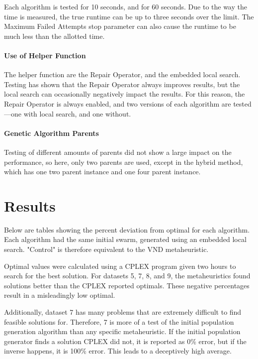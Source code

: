 \documentclass[11pt, letterpaper, onecolumn]{article}
\begin{document}
Each algorithm is tested for 10 seconds, and for 60 seconds. Due to the way the time is measured, the true runtime can be up to three seconds over the limit. The Maximum Failed Attempts stop parameter can also cause the runtime to be much less than the allotted time. 

\paragraph{Use of Helper Function}

The helper function are the Repair Operator, and the embedded local search. Testing has shown that the Repair Operator always improves results, but the local search can occasionally negatively impact the results. For this reason, the Repair Operator is always enabled, and two versions of each algorithm are tested---one with local search, and one without. 

\paragraph{Genetic Algorithm Parents}

Testing of different amounts of parents did not show a large impact on the performance, so here, only two parents are used, except in the hybrid method, which has one two parent instance and one four parent instance. 

\section{Results}

Below are tables showing the percent deviation from optimal for each algorithm. Each algorithm had the same initial swarm, generated using an embedded local search. "Control" is therefore equivalent to the VND metaheuristic. 

Optimal values were calculated using a CPLEX program given two hours to search for the best solution. For datasets 5, 7, 8, and 9, the metaheuristics found solutions better than the CPLEX reported optimals. These negative percentages result in a misleadingly low optimal. 

Additionally, dataset 7 has many problems that are extremely difficult to find feasible solutions for. Therefore, 7 is more of a test of the initial population generation algorithm than any specific metaheuristic. If the initial population generator finds a solution CPLEX did not, it is reported as 0\% error, but if the inverse happens, it is 100\% error. This leads to a deceptively high average. 
\end{document}
